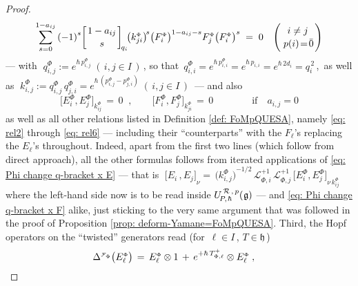 \documentclass[12pt,reqno,twoside,a4paper]{amsart}
\numberwithin{equation}{section}
\theoremstyle{definition}
\newtheorem{free text}[lema]{}
\theoremstyle{remark}
\newcommand{\zero}{{\bar{0}}}
\newcommand{\R}{{\mathcal R}}
\newcommand{\F}{{\mathcal F}}
\def \L {\mathcal{L}}
\def \lieg{\mathfrak{g}}
\def \lieh{\mathfrak{h}}
\def \Phipicc {{\scriptscriptstyle \Phi}}
\def \uRpPhg{U^{\,\R\,,\,p}_{\!P,\hskip0,7pt\hbar}(\hskip0,5pt\lieg)}
\theoremstyle{plain}
\begin{document}
\begin{proof}
$$\begin{aligned}
%
   \sum\limits_{s=0}^{1-a_{ij}} {(-1)}^s {\left[ {{1-a_{ij}} \atop s}
\right]}_{\!q_i} \!
 {\big( k_{ji}^{\scriptscriptstyle \Phi} \big)}^{\!s}
 {\big( F^{\scriptscriptstyle \Phi}_i \big)}^{1-a_{ij}-s} F^{\scriptscriptstyle \Phi}_j {\big( F^{\scriptscriptstyle \Phi}_i \big)}^s
\; = \;  0   \quad   \Bigg( {{i \neq j} \atop {\,p(i) \!=\! \zero}} \Bigg)
%
 \end{aligned}  $$
%
 --- with  $ \; q^{\scriptscriptstyle \Phi}_{i,j} := e^{\hbar \, p^{\scriptscriptstyle \Phi}_{i,j}} \; (\, i , j \in I \,) \, $,  so that  $ \, q^{\scriptscriptstyle \Phi}_{i,i} = e^{\hbar \, p^{\scriptscriptstyle \Phi}_{i,i}} = e^{\hbar \, p_{i,i}} = e^{\hbar \, 2 d_i} = q_i^{\,2} \, $,  \,as well as  $ \; k^{\scriptscriptstyle \Phi}_{i,j} := q^{\scriptscriptstyle \Phi}_{i,j} \, q^{\scriptscriptstyle \Phi}_{j,i} = e^{\hbar \, (p^{\scriptscriptstyle \Phi}_{i,j} - p^{\scriptscriptstyle \Phi}_{j,i})} \; (\, i , j \in I \,) \, $  ---   and also
%
  $$  \big[ E^{\scriptscriptstyle \Phi}_i , E^{\scriptscriptstyle \Phi}_j \big]_{k^{\scriptscriptstyle \Phi}_{ij}} \, = \, 0  \;\; ,  \qquad
      \big[ F^{\scriptscriptstyle \Phi}_i , F^{\scriptscriptstyle \Phi}_j \big]_{k^{\scriptscriptstyle \Phi}_{ji}} \, = \, 0
   \qquad \qquad   \text{if} \quad  a_{i,j} = 0  $$
%
 as well as all other relations listed in  Definition \ref{def: FoMpQUESA},  namely  \eqref{eq: rel2}  through  \eqref{eq: rel6}   --- including their ``counterparts'' with the  $ F_\ell $'s  replacing the  $ E_\ell $'s  throughout.  Indeed, apart from the first two lines (which follow from direct approach), all the other formulas follows from iterated applications of  \eqref{eq: Phi change q-bracket x E}   --- that is
%
  $ \; {\big[ E_i \, , E_j \big]}_\nu  = \,  {\big( k_{i,j}^\Phipicc \big)}^{-1/2} \, \L_{\Phipicc,i}^{+1} \, \L_{\Phipicc,j}^{+1} \, {\big[ E_i^\Phipicc , E_j^\Phipicc \big]}_{\nu \, k_{i{}j}^\Phipicc} \; $
%
 where the left-hand side now is to be read inside  $ \uRpPhg $  ---   and  \eqref{eq: Phi change q-bracket x F}  alike, just sticking to the very same argument that was followed in the proof of  Proposition \ref{prop: deform-Yamane=FoMpQUESA}.
%
 \vskip5pt
%
   Third, the Hopf operators on the ``twisted'' generators read  (for  $ \, \ell \in I \, $,  $ T \in \lieh \, $)
%
  $$  \begin{matrix}
   \Delta^{\scriptscriptstyle \F_\Phi}\big(E^{\scriptscriptstyle \Phi}_\ell\big)
\, = \,  E^{\scriptscriptstyle \Phi}_\ell \otimes 1 \, + \, e^{+\hbar\,T^+_{{\scriptscriptstyle \Phi},\ell}} \otimes E^{\scriptscriptstyle \Phi}_\ell  \; ,   &   \hskip1pt

\end{matrix}$$
\end{proof}
\end{document}
